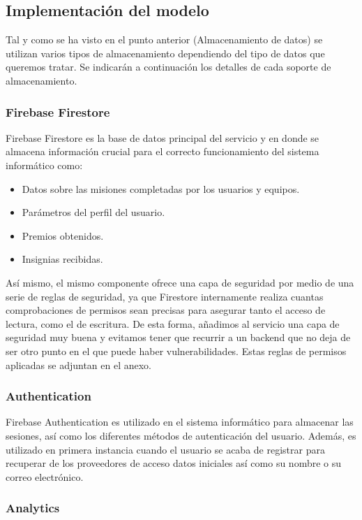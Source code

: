 \documentclass[twoside]{report}
\begin{document}
\subsection{Implementación del modelo}

Tal y como se ha visto en el punto anterior (Almacenamiento de datos) se utilizan varios tipos de almacenamiento dependiendo del tipo de datos que queremos tratar. Se indicarán a continuación los detalles de cada soporte de almacenamiento.

\subsubsection{Firebase Firestore}

Firebase Firestore es la base de datos principal del servicio y en donde se almacena información crucial para el correcto funcionamiento del sistema informático como:
\begin{itemize}
\item Datos sobre las misiones completadas por los usuarios y equipos.
\item Parámetros del perfil del usuario.
\item Premios obtenidos.
\item Insignias recibidas.
\end{itemize} 

Así mismo, el mismo componente ofrece una capa de seguridad por medio de una serie de reglas de seguridad, ya que Firestore internamente realiza cuantas comprobaciones de permisos sean precisas para asegurar tanto el acceso de lectura, como el de escritura. De esta forma, añadimos al servicio una capa de seguridad muy buena y evitamos tener que recurrir a un backend que no deja de ser otro punto en el que puede haber vulnerabilidades. Estas reglas de permisos aplicadas se adjuntan en el anexo.

\subsubsection{Authentication}

Firebase Authentication es utilizado en el sistema informático para almacenar las sesiones, así como los diferentes métodos de autenticación del usuario. Además, es utilizado en primera instancia cuando el usuario se acaba de registrar para recuperar de los proveedores de acceso datos iniciales así como su nombre o su correo electrónico.

\subsubsection{Analytics}
\end{document}
